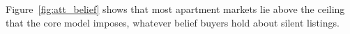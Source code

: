 Figure~\ref{fig:att_belief} shows that most apartment markets lie above the ceiling that the core model imposes, whatever belief buyers hold about silent listings.
